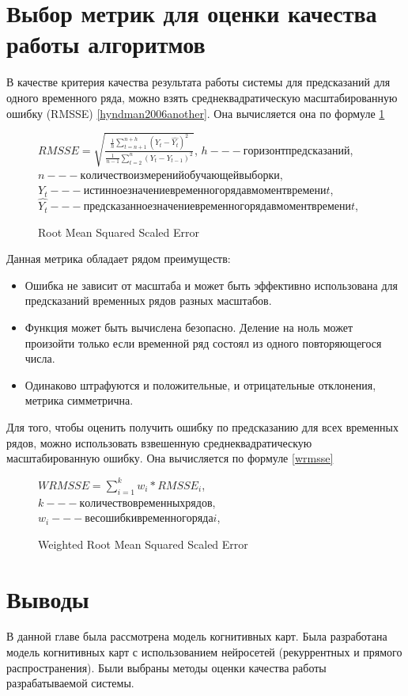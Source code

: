 \section{Выбор метрик для оценки качества работы алгоритмов}

В качестве критерия качества результата работы системы для предсказаний
для одного временного ряда, можно взять среднеквадратическую
масштабированную ошибку (RMSSE) \ref{hyndman2006another}.
Она вычисляется она по формуле \ref{img:rmsse}

\def\figurename{Формула}
\begin{figure}[t]
	\centering
	$ RMSSE = \sqrt{ \frac{ \frac{1}{h} \sum_{t=n+1}^{n+h}(Y_t - \hat{Y_t})^2  }{ \frac{1}{n-1} \sum_{t=2}^{n} (Y_t - Y_{t-1})^2 } } $,
	$ h --- горизонт предсказаний $,
	$ n --- количество измерений обучающей выборки $,
	$ Y_t --- истинное значение временного ряда в момент времени t $,
	$ \hat{Y_t} --- предсказанное значение временного ряда в момент времени t $,

	\caption{Root Mean Squared Scaled Error}
	\label{img:rmsse}
\end{figure}
\def\figurename{Рис.}

Данная метрика обладает рядом преимуществ:

\begin{itemize}
	\item Ошибка не зависит от масштаба и может быть эффективно использована для предсказаний временных рядов разных масштабов.
	\item Функция может быть вычислена безопасно. Деление на ноль может произойти только если временной ряд состоял из одного повторяющегося числа.
	\item Одинаково штрафуются и положительные, и отрицательные отклонения, метрика симметрична.
\end{itemize}

Для того, чтобы оценить получить ошибку по предсказанию для всех временных рядов,
можно использовать взвешенную среднеквадратическую масштабированную ошибку.
Она вычисляется по формуле \ref{wrmsse}

\def\figurename{Формула}
\begin{figure}[t]
	\centering
	$ WRMSSE = \sum_{i=1}^{k} w_i * RMSSE_i $,
	$ k --- количество временных рядов $,
	$ w_i --- вес ошибки временного ряда i $,
	\caption{Weighted Root Mean Squared Scaled Error}
	\label{img:wrmsse}
\end{figure}
\def\figurename{Рис.}

\section{Выводы}

В данной главе была рассмотрена модель когнитивных карт.
Была разработана модель когнитивных карт
с использованием нейросетей (рекуррентных и прямого распространения).
Были выбраны методы оценки качества работы разрабатываемой системы.